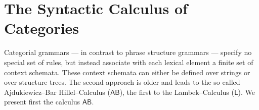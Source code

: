 \newcommand{\circplus}{\,\raisebox{.1em}{\footnotesize{$\oplus$}}\,}
\newcommand{\circminus}{\,\raisebox{.1em}{\footnotesize{$\ominus$}}\,}
\section{The Syntactic Calculus of Ca\-te\-go\-ries}
\label{kap3-2}
%
%
%
Categorial grammars --- in contrast to phrase structure grammars ---
specify no special set of rules, but instead associate with
each lexical element a finite set of context schemata. These
context schemata can either be defined over strings or over
structure trees. The second approach is older and leads to the so
called Aj\-du\-kie\-wicz--Bar Hillel--Calculus ($\mathsf{AB}$),
the first to the Lambek--Cal\-cu\-lus ($\mathsf{L}$).
\nocite{ajdukiewicz:konnexitaet}
We present first the calculus $\mathsf{AB}$.


